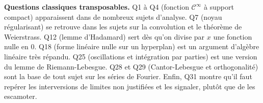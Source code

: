 \documentclass[11pt,a4paper]{article}
\begin{document}
\textbf{Questions classiques transposables.} Q1 à Q4 (fonction \(\mathcal C^\infty\) à support compact) apparaissent dans de nombreux sujets d'analyse. Q7 (noyau régularisant) se retrouve dans les sujets sur la convolution et le théorème de Weierstrass. Q12 (lemme d'Hadamard) sert dès qu'on divise par \(x\) une fonction nulle en \(0\). Q18 (forme linéaire nulle sur un hyperplan) est un argument d'algèbre linéaire très répandu. Q25 (oscillations et intégration par parties) est une version du lemme de Riemann-Lebesgue. Q28 et Q29 (Cantor-Lebesgue et orthogonalité) sont la base de tout sujet sur les séries de Fourier. Enfin, Q31 montre qu'il faut repérer les interversions de limites non justifiées et les signaler, plutôt que de les escamoter.
\end{document}
